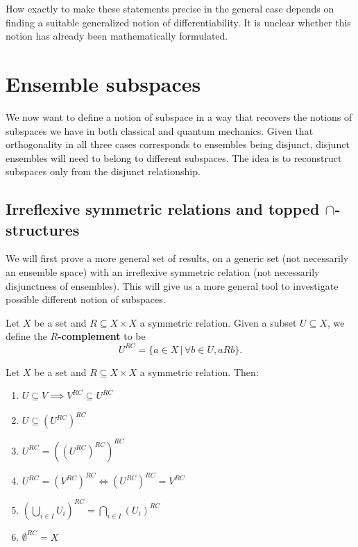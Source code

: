 \begin{remark}
	How exactly to make these statements precise in the general case depends on finding a suitable generalized notion of differentiability. It is unclear whether this notion has already been mathematically formulated.
\end{remark}

\section{Ensemble subspaces}

We now want to define a notion of subspace in a way that recovers the notions of subspaces we have in both classical and quantum mechanics. Given that orthogonality in all three cases corresponds to ensembles being disjunct, disjunct ensembles will need to belong to different subspaces. The idea is to reconstruct subspaces only from the disjunct relationship.

\subsection{Irreflexive symmetric relations and topped $\cap$-structures}

We will first prove a more general set of results, on a generic set (not necessarily an ensemble space) with an irreflexive symmetric relation (not necessarily disjunctness of ensembles). This will give us a more general tool to investigate possible different notion of subspaces.

\begin{defn}
	Let $X$ be a set and $R \subseteq X \times X$ a symmetric relation. Given a subset $U \subseteq X$, we define the \textbf{$R$-complement} to be
	$$ U^{RC} = \{ a \in X \, | \, \forall b \in U, aRb  \}. $$
\end{defn}

\begin{prop}\label{pm_es_rComplProps}
	Let $X$ be a set and $R \subseteq X \times X$ a symmetric relation. Then:
	\begin{enumerate}
		\item $U \subseteq V \implies V^{RC} \subseteq U^{RC}$
		\item $U \subseteq (U^{RC})^{RC}$
		\item $U^{RC} = ((U^{RC})^{RC})^{RC}$
		\item $U^{RC} = (V^{RC})^{RC} \iff (U^{RC})^{RC} = V^{RC}$
		\item $(\bigcup_{i \in I} U_i )^{RC} = \bigcap_{i \in I} (U_i)^{RC}$
		\item $\emptyset^{RC} = X$
	\end{enumerate}
\end{prop}

